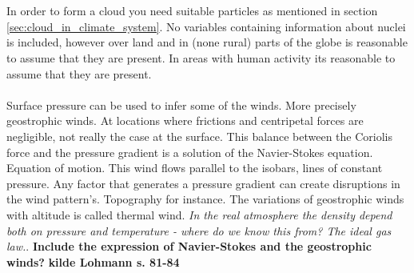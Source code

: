 \\ \\ 
In order to form a cloud you need suitable particles as mentioned in section \ref{sec:cloud_in_climate_system}. No variables containing information about nuclei is included, however over land and in (none rural) parts of the globe is reasonable to assume that they are present. In areas with human activity its reasonable to assume that they are present.
\\ \\
Surface pressure can be used to infer some of the winds. More precisely geostrophic winds. At locations where frictions and centripetal forces are negligible, not really  the case at the surface. This balance between the Coriolis force and the pressure gradient is a solution of the Navier-Stokes equation. Equation of motion. This wind flows parallel to the isobars, lines of constant pressure. Any factor that generates a pressure gradient can create disruptions in the wind pattern's. Topography for instance. The variations of geostrophic winds with altitude is called thermal wind. \textit{In the real atmosphere the density depend both on pressure and temperature - where do we know this from? The ideal gas law.}. \textbf{Include the expression of Navier-Stokes and the geostrophic winds?}
\textbf{kilde Lohmann s. 81-84}
\\ \\ 
